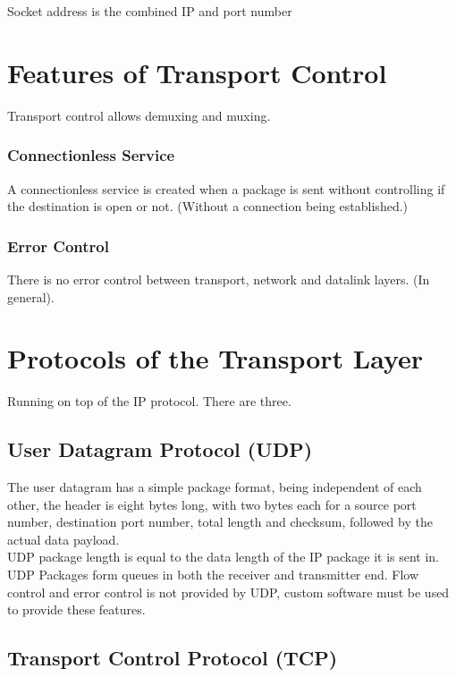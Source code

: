 \documentclass[11pt,a4paper,twoside]{book}
\begin{document}
Socket address is the combined IP and port number

\section{Features of Transport Control}

Transport control allows demuxing and muxing.\\

\subsubsection{Connectionless Service}

A connectionless service is created when a package is sent without controlling if the destination is open or not. (Without a connection being established.)

\subsubsection{Error Control}

There is no error control between transport, network and datalink layers. (In general).

\section{Protocols of the Transport Layer}

Running on top of the IP protocol. There are three.

\subsection{User Datagram Protocol (UDP)}

The user datagram has a simple package format, being independent of each other, the header is eight bytes long, with two bytes each for a source port number, destination port number, total length and checksum, followed by the actual data payload.\\

UDP package length is equal to the data length of the IP package it is sent in.\\

UDP Packages form queues in both the receiver and transmitter end. Flow control and error control is not provided by UDP, custom software must be used to provide these features.

\subsection{Transport Control Protocol (TCP)}
\end{document}
